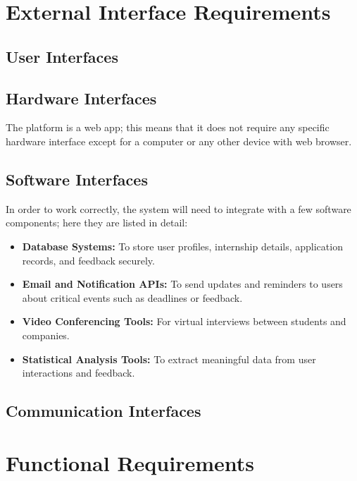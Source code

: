 \section{External Interface Requirements}
\label{sec:external_interface_requirements}%

\subsection{User Interfaces}
\label{subsec:user_interfaces}%

\subsection{Hardware Interfaces}
\label{subsec:hardware_interfaces}%
The platform is a web app; this means that it does not require any specific hardware interface except for a computer or any other device with web browser.  
\subsection{Software Interfaces}
\label{subsec:software_interfaces}%
In order to work correctly, the system will need to integrate with a few software components; here they are listed in detail:
\begin{itemize}
    \item \textbf{Database Systems:} To store user profiles, internship details, application records, and feedback securely.
    \item \textbf{Email and Notification APIs:} To send updates and reminders to users about critical events such as deadlines or feedback.
    \item \textbf{Video Conferencing Tools:} For virtual interviews between students and companies.
    \item \textbf{Statistical Analysis Tools:} To extract meaningful data from user interactions and feedback.
\end{itemize}
 
\subsection{Communication Interfaces}
\label{subsec:communication_interfaces}%

\section{Functional Requirements}
\label{sec:functional_requirements}%

